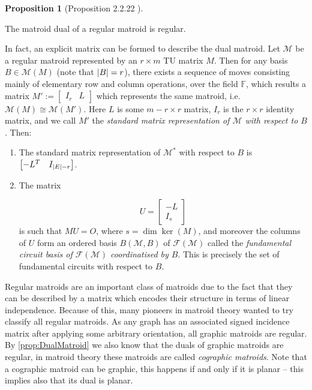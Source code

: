 \documentclass[12pt]{report}
\theoremstyle{definition}
\newtheorem{proposition}[theorem]{Proposition}
\DeclarePairedDelimiter\abs{\lvert}{\rvert}
\def\F{\mathbb F}
\def\calF{\mathcal F}
\def\calM{\mathcal M}
\theoremstyle{upright}
\begin{document}
\begin{proposition}[Proposition 2.2.22 \cite{oxley2006matroid}]\label{prop:DualRegular}

    The matroid dual of a regular matroid is regular.
    
\end{proposition}

In fact, an explicit matrix can be formed to describe the dual matroid.
Let $\calM$ be a regular matroid represented by an $r\times m$ TU matrix $M$.
Then for any basis $B\in\calM(M)$ (note that $\abs*{B}=r$), there exists a sequence of moves consisting mainly of elementary row and column operations, over the field $\F$, which results a matrix $M':=\begin{bmatrix}
    I_r & L
\end{bmatrix}$ which represents the same matroid, i.e. $\calM(M)\cong\calM(M')$.
Here $L$ is some $m-r\times r$ matrix, $I_r$ is the $r\times r$ identity matrix, and we call $M'$ the {\em standard matrix representation of $\calM$ with respect to $B$}.
Then:

\begin{enumerate}
    \item The standard matrix representation of $\calM^\ast$ with respect to $B$ is $\begin{bmatrix}
        -L^T & I_{\abs{E}-r}
    \end{bmatrix}$.
    \item The matrix

    \[U=\begin{bmatrix}
        -L\\
        I_s
    \end{bmatrix}\]
    is such that $MU=O$, where $s=\dim\ker(M)$, and moreover the columns of $U$ form an ordered basis $B(\calM, B)$ of $\calF(\calM)$ called the {\em fundamental circuit basis of $\calF(\calM)$ coordinatised by $B$}.
    This is precisely the set of fundamental circuits with respect to $B$.
\end{enumerate}

Regular matroids are an important class of matroids due to the fact that they can be described by a matrix which encodes their structure in terms of linear independence.
Because of this, many pioneers in matroid theory wanted to try classify all regular matroids.
As any graph has an associated signed incidence matrix after applying some arbitrary orientation, all graphic matroids are regular.
By \cref{prop:DualMatroid} we also know that the duals of graphic matroids are regular, in matroid theory these matroids are called \textit{cographic matroids}.
Note that a cographic matroid can be graphic, this happens if and only if it is planar -- this implies also that its dual is planar.
\end{document}
